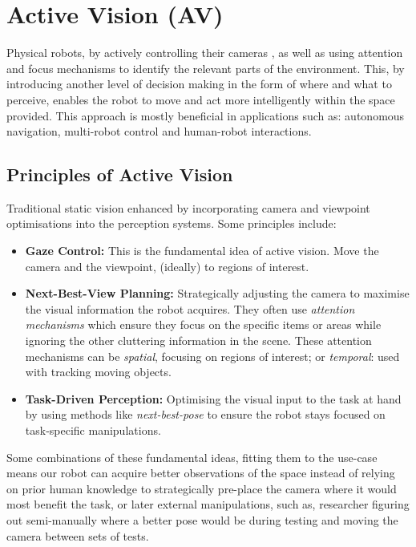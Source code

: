 \section{Active Vision (AV)}
    Physical robots, by actively controlling their cameras \cite{Aloimonos1988}, as well as using attention and focus mechanisms to identify the relevant parts of the environment. This, by introducing another level of decision making in the form of where and what to perceive, enables the robot to move and act more intelligently within the space provided. This approach is mostly beneficial in applications such as: autonomous navigation, multi-robot control and human-robot interactions. \cite{breazeal2001hri}
    
  \subsection{Principles of Active Vision}
  Traditional static vision enhanced by incorporating camera and viewpoint optimisations into the perception systems. Some principles include:
  \begin{itemize}
    \item \textbf{Gaze Control:} This is the fundamental idea of active vision. Move the camera and the viewpoint, (ideally) to regions of interest.
    \item \textbf{Next-Best-View Planning:} Strategically adjusting the camera to maximise the visual information the robot acquires. They often use \emph{attention mechanisms} which ensure they focus on the specific items or areas \cite{Burusa_2024} while ignoring the other cluttering information in the scene. These attention mechanisms can be \emph{spatial}, focusing on regions of interest; or \emph{temporal}: used with tracking moving objects.
    \item \textbf{Task-Driven Perception:} Optimising the visual input to the task at hand by using methods like \emph{next-best-pose} to ensure the robot stays focused on task-specific manipulations.
  \end{itemize}
  Some combinations of these fundamental ideas, fitting them to the use-case means our robot can acquire better observations of the space instead of relying on prior human knowledge to strategically pre-place the camera where it would most benefit the task, or later external manipulations, such as, researcher figuring out semi-manually where a better pose would be during testing and moving the camera between sets of tests.

